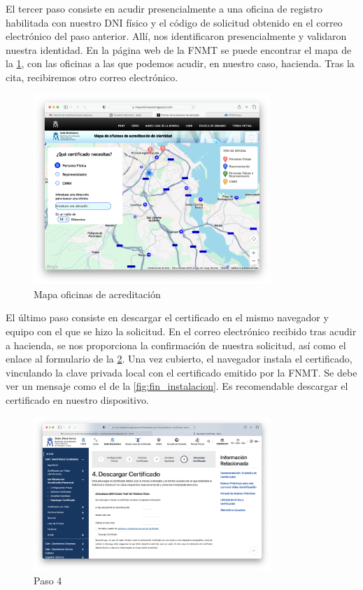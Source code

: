El tercer paso consiste en acudir presencialmente a una oficina de registro habilitada con nuestro DNI físico y el código de solicitud obtenido en el correo electrónico del paso anterior. Allí, nos identificaron presencialmente y validaron nuestra identidad. En la página web de la FNMT se puede encontrar el mapa de la \ref{fig:mapa}, con las oficinas a las que podemos acudir, en nuestro caso, hacienda. Tras la cita, recibiremos otro correo electrónico.

\begin{figure}[H]
    \centering
    \includegraphics[width=0.8\textwidth]{mapa_ej5a.png}
    \caption{Mapa oficinas de acreditación}
    \label{fig:mapa}
\end{figure}

El último paso consiste en descargar el certificado en el mismo navegador y equipo con el que se hizo la solicitud. En el correo electrónico recibido tras acudir a hacienda, se nos proporciona la confirmación de nuestra solicitud, así como el enlace al formulario de la \ref{fig:paso4}. Una vez cubierto, el navegador instala el certificado, vinculando la clave privada local con el certificado emitido por la FNMT. Se debe ver un mensaje como el de la \ref{fig:fin_instalacion}. Es recomendable descargar el certificado en nuestro dispositivo.

\begin{figure}[H]
    \centering
    \includegraphics[width=0.8\textwidth]{paso4_ej5a.png}
    \caption{Paso 4}
    \label{fig:paso4}
\end{figure}

